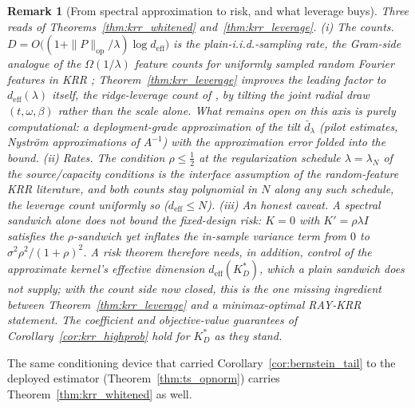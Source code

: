 \documentclass{article}
\newtheorem{remark}[theorem]{Remark}
\begin{document}
\begin{remark}[From spectral approximation to risk, and what leverage buys]\label{rmk:risk}
Three reads of Theorems~\ref{thm:krr_whitened} and~\ref{thm:krr_leverage}. \emph{(i) The counts.} $D=O\bigl((1+\|P\|_{\mathrm{op}}/\lambda)\log d_{\mathrm{eff}}\bigr)$ is the plain-i.i.d.-sampling rate, the Gram-side analogue of the $\Omega(1/\lambda)$ feature counts for \emph{uniformly} sampled random Fourier features in KRR \citep{avron2017random,rudi2017generalization,bach2017equivalence}; Theorem~\ref{thm:krr_leverage} improves the leading factor to $d_{\mathrm{eff}}(\lambda)$ itself, the ridge-leverage count of \citet{avron2017random,li2021unified}, by tilting the \emph{joint} radial draw $(t,\omega,\beta)$ rather than the scale alone. What remains open on this axis is purely computational: a deployment-grade approximation of the tilt $\bar d_\lambda$ (pilot estimates, Nystr\"om approximations of $A^{-1}$) with the approximation error folded into the bound. \emph{(ii) Rates.} The condition $\rho\le\tfrac12$ at the regularization schedule $\lambda=\lambda_N$ of the source/capacity conditions is the interface assumption of the random-feature KRR literature, and both counts stay polynomial in $N$ along any such schedule, the leverage count uniformly so ($d_{\mathrm{eff}}\le N$). \emph{(iii) An honest caveat.} A spectral sandwich alone does not bound the fixed-design risk: $K=0$ with $K'=\rho\lambda I$ satisfies the $\rho$-sandwich yet inflates the in-sample variance term from $0$ to $\sigma^2\rho^2/(1+\rho)^2$. A risk theorem therefore needs, in addition, control of the \emph{approximate} kernel's effective dimension $d_{\mathrm{eff}}(K^*_D)$, which a plain sandwich does not supply; with the count side now closed, this is the one missing ingredient between Theorem~\ref{thm:krr_leverage} and a minimax-optimal RAY-KRR statement. The coefficient and objective-value guarantees of Corollary~\ref{cor:krr_highprob} hold for $K^*_D$ as they stand.
\end{remark}

The same conditioning device that carried Corollary~\ref{cor:bernstein_tail} to the deployed estimator (Theorem~\ref{thm:ts_opnorm}) carries Theorem~\ref{thm:krr_whitened} as well.
\end{document}
